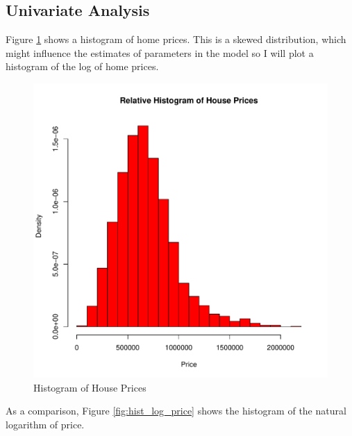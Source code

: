 \subsection{Univariate Analysis}

Figure \ref{fig:hist_price} shows a histogram of home prices.
This is a skewed distribution, which might influence the
estimates of parameters in the model so I will plot a histogram of the log of home prices.


\begin{figure}[h!]
  \centering
  \includegraphics[scale = 0.5, keepaspectratio=true]{../Figures/hist_price}
  \caption{Histogram of House Prices} \label{fig:hist_price}
\end{figure}



\pagebreak
As a comparison, Figure \ref{fig:hist_log_price} shows the histogram of the natural logarithm of
price.

